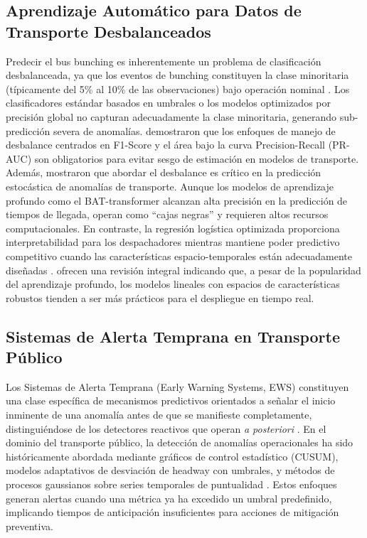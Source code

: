 \documentclass[fleqn,10pt,lineno]{wlpeerj}
\begin{document}
\subsection{Aprendizaje Autom\'atico para Datos de Transporte Desbalanceados}

Predecir el bus bunching es inherentemente un problema de clasificaci\'on desbalanceada, ya que los eventos de bunching constituyen la clase minoritaria (t\'ipicamente del 5\% al 10\% de las observaciones) bajo operaci\'on nominal \citep{16}. Los clasificadores est\'andar basados en umbrales o los modelos optimizados por precisi\'on global no capturan adecuadamente la clase minoritaria, generando sub-predicci\'on severa de anomal\'ias. \citet{17} demostraron que los enfoques de manejo de desbalance centrados en F1-Score y el \'area bajo la curva Precision-Recall (PR-AUC) son obligatorios para evitar sesgo de estimaci\'on en modelos de transporte. Adem\'as, \citet{18} mostraron que abordar el desbalance es cr\'itico en la predicci\'on estoc\'astica de anomal\'ias de transporte. Aunque los modelos de aprendizaje profundo como el BAT-transformer \citep{19} alcanzan alta precisi\'on en la predicci\'on de tiempos de llegada, operan como ``cajas negras'' y requieren altos recursos computacionales. En contraste, la regresi\'on log\'istica optimizada proporciona interpretabilidad para los despachadores mientras mantiene poder predictivo competitivo cuando las caracter\'isticas espacio-temporales est\'an adecuadamente dise\~nadas \citep{20}. \citet{21} ofrecen una revisi\'on integral indicando que, a pesar de la popularidad del aprendizaje profundo, los modelos lineales con espacios de caracter\'isticas robustos tienden a ser m\'as pr\'acticos para el despliegue en tiempo real.

\subsection{Sistemas de Alerta Temprana en Transporte P\'ublico}

Los Sistemas de Alerta Temprana (Early Warning Systems, EWS) constituyen una clase espec\'ifica de mecanismos predictivos orientados a se\~nalar el inicio inminente de una anomal\'ia antes de que se manifieste completamente, distingui\'endose de los detectores reactivos que operan \textit{a posteriori} \citep{4}. En el dominio del transporte p\'ublico, la detecci\'on de anomal\'ias operacionales ha sido hist\'oricamente abordada mediante gr\'aficos de control estad\'istico (CUSUM), modelos adaptativos de desviaci\'on de headway con umbrales, y m\'etodos de procesos gaussianos sobre series temporales de puntualidad \citep{8}. Estos enfoques generan alertas cuando una m\'etrica ya ha excedido un umbral predefinido, implicando tiempos de anticipaci\'on insuficientes para acciones de mitigaci\'on preventiva.
\end{document}
